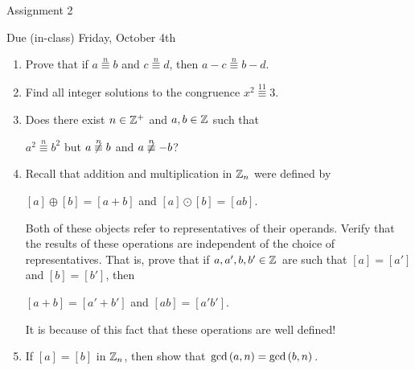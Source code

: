 \documentclass[11pt,fleqn,dvipsnames,usenames]{article}
\renewcommand{\headrulewidth}{1pt}
\newcommand{\p}{\noindent}
\begin{document}
\fancyhead[L]{\course}
\fancyhead[R]{\term}
\renewcommand{\headrulewidth}{0.4pt}

\begin{center}
{\huge Assignment 2}
\vsp

{\large Due (in-class) Friday, October 4th}
\end{center}

\begin{enumerate}
\item Prove that if $a\overset{n}{\equiv}b$ and $c\overset{n}{\equiv}d$, then $a-c\overset{n}{\equiv}b-d$.
\item Find all integer solutions to the congruence $x^2\overset{11}{\equiv}3$.
\item Does there exist $n\in\mathbb{Z}^{+}$ and $a,b\in\mathbb{Z}$ such that
\begin{center}
$a^2\overset{n}{\equiv}b^2$ but $a\not\overset{n}{\equiv}b$ and $a\not\overset{n}{\equiv}-b$?
\end{center}
\item Recall that addition and multiplication in $\mathbb{Z}_n$ were defined by
\begin{center}
$[a] \oplus [b] = [a + b]$ and $[a]\odot [b] = [ab]$.
\end{center}
\p Both of these objects refer to representatives of their operands.  Verify that the results of these operations are independent of the choice of representatives.  That is, prove that if $a,a',b,b'\in\mathbb{Z}$ are such that $[a] = [a']$ and $[b] = [b']$, then
\begin{center}
$[a+b] = [a'+b']$ and $[ab] = [a'b']$.
\end{center}

\note It is because of this fact that these operations are well defined!
\item If $[a] = [b]$ in $\mathbb{Z}_{n}$, then show that $\text{gcd}\left(a,n\right) = \text{gcd}\left(b,n\right)$.



\end{enumerate}
\end{document}
